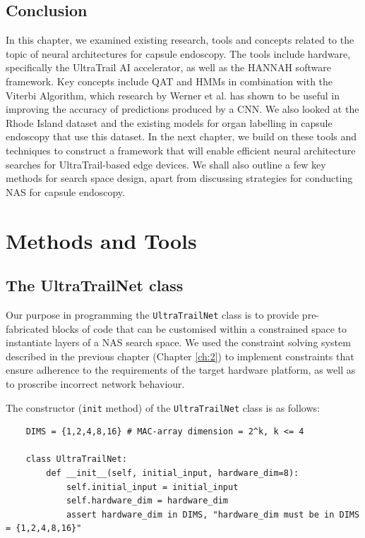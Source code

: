 \documentclass[11pt,a4paper, open=any]{scrbook}
\newcounter{constraint}[chapter]
\newcommand{\py}[1]{\texttt{#1}}
\begin{document}
\section{Conclusion}
In this chapter, we examined existing research, tools and concepts related to the topic of neural architectures for capsule endoscopy. The tools include hardware, specifically the UltraTrail AI accelerator, as well as the HANNAH software framework. Key concepts include QAT and HMMs in combination with the Viterbi Algorithm, which research by Werner et al. has shown to be useful in improving the accuracy of predictions produced by a CNN. We also looked at the Rhode Island dataset and the existing models for organ labelling in capsule endoscopy that use this dataset. In the next chapter, we build on these tools and techniques to construct a framework that will enable efficient neural architecture searches for UltraTrail-based edge devices. We shall also outline a few key methods for search space design, apart from discussing strategies for conducting NAS for capsule endoscopy.

\chapter{Methods and Tools}

\section{The UltraTrailNet class}\label{sec:utn}
Our purpose in programming the \py{UltraTrailNet} class is to provide pre-fabricated blocks of code that can be customised within a constrained space to instantiate layers of a NAS search space. We used the constraint solving system described in the previous chapter (Chapter \ref{ch:2}) to implement constraints that ensure adherence to the requirements of the target hardware platform, as well as to proscribe incorrect network behaviour. 

The constructor (\py{init} method) of the \py{UltraTrailNet} class is as follows:

\begin{verbatim}
	DIMS = {1,2,4,8,16} # MAC-array dimension = 2^k, k <= 4
	
	class UltraTrailNet:
		def __init__(self, initial_input, hardware_dim=8):
			self.initial_input = initial_input
			self.hardware_dim = hardware_dim
			assert hardware_dim in DIMS, "hardware_dim must be in DIMS = {1,2,4,8,16}"	
\end{verbatim}
\end{document}
